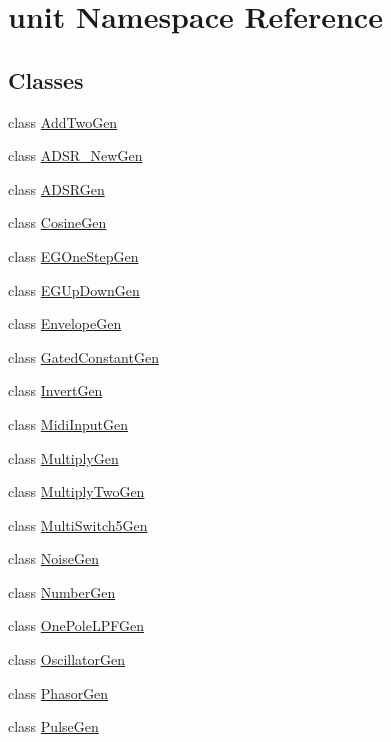 \hypertarget{namespaceunit}{\section{unit Namespace Reference}
\label{namespaceunit}
}
\subsection*{Classes}
\begin{DoxyCompactItemize}
\item 
class \hyperlink{classunit_1_1AddTwoGen}{Add\-Two\-Gen}
\item 
class \hyperlink{classunit_1_1ADSR__NewGen}{A\-D\-S\-R\-\_\-\-New\-Gen}
\item 
class \hyperlink{classunit_1_1ADSRGen}{A\-D\-S\-R\-Gen}
\item 
class \hyperlink{classunit_1_1CosineGen}{Cosine\-Gen}
\item 
class \hyperlink{classunit_1_1EGOneStepGen}{E\-G\-One\-Step\-Gen}
\item 
class \hyperlink{classunit_1_1EGUpDownGen}{E\-G\-Up\-Down\-Gen}
\item 
class \hyperlink{classunit_1_1EnvelopeGen}{Envelope\-Gen}
\item 
class \hyperlink{classunit_1_1GatedConstantGen}{Gated\-Constant\-Gen}
\item 
class \hyperlink{classunit_1_1InvertGen}{Invert\-Gen}
\item 
class \hyperlink{classunit_1_1MidiInputGen}{Midi\-Input\-Gen}
\item 
class \hyperlink{classunit_1_1MultiplyGen}{Multiply\-Gen}
\item 
class \hyperlink{classunit_1_1MultiplyTwoGen}{Multiply\-Two\-Gen}
\item 
class \hyperlink{classunit_1_1MultiSwitch5Gen}{Multi\-Switch5\-Gen}
\item 
class \hyperlink{classunit_1_1NoiseGen}{Noise\-Gen}
\item 
class \hyperlink{classunit_1_1NumberGen}{Number\-Gen}
\item 
class \hyperlink{classunit_1_1OnePoleLPFGen}{One\-Pole\-L\-P\-F\-Gen}
\item 
class \hyperlink{classunit_1_1OscillatorGen}{Oscillator\-Gen}
\item 
class \hyperlink{classunit_1_1PhasorGen}{Phasor\-Gen}
\item 
class \hyperlink{classunit_1_1PulseGen}{Pulse\-Gen}
\item 

\end{DoxyCompactItemize}
